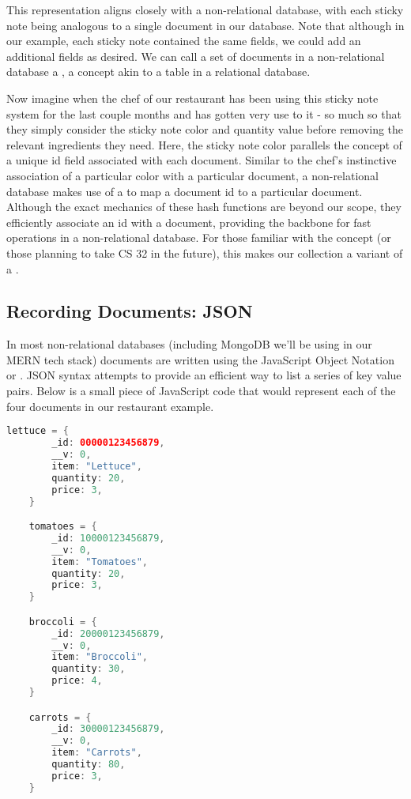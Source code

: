 This representation aligns closely with a non-relational database, with each sticky note being analogous to a single document in our database. Note that although in our example, each sticky note contained the same fields, we could add an additional fields as desired. We can call a set of documents in a non-relational database a , a concept akin to a table in a relational database.

Now imagine when the chef of our restaurant has been using this sticky note system for the last couple months and has gotten very use to it - so much so that they simply consider the sticky note color and quantity value before removing the relevant ingredients they need. Here, the sticky note color parallels the concept of a unique id field associated with each document. Similar to the chef's instinctive association of a particular color with a particular document, a non-relational database makes use of a  to map a document id to a particular document. Although the exact mechanics of these hash functions are beyond our scope, they efficiently associate an id with a document, providing the backbone for fast operations in a non-relational database. For those familiar with the concept (or those planning to take CS 32 in the future), this makes our collection a variant of a .

\subsection{Recording Documents: JSON}

In most non-relational databases (including MongoDB we'll be using in our MERN tech stack) documents are written using the JavaScript Object Notation or . JSON syntax attempts to provide an efficient way to list a series of key value pairs. Below is a small piece of JavaScript code that would represent each of the four documents in our restaurant example. 

\vspace{.5cm}

\begin{lstlisting}[language=Java]
    lettuce = {
        _id: 00000123456879,
        __v: 0,
        item: "Lettuce",
        quantity: 20,
        price: 3,
    }

    tomatoes = {
        _id: 10000123456879,
        __v: 0,
        item: "Tomatoes",
        quantity: 20,
        price: 3,
    }

    broccoli = {
        _id: 20000123456879,
        __v: 0,
        item: "Broccoli",
        quantity: 30,
        price: 4,
    }

    carrots = {
        _id: 30000123456879,
        __v: 0,
        item: "Carrots",
        quantity: 80,
        price: 3,
    }
\end{lstlisting}

